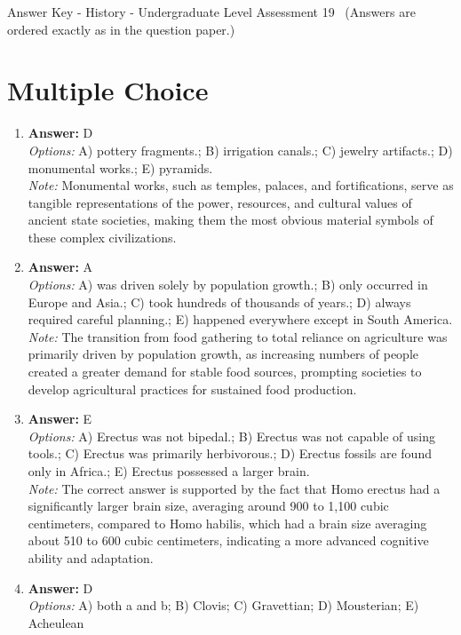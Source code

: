 \documentclass[12pt]{article}
\begin{document}
\begin{center}
Answer Key - History - Undergraduate Level Assessment 19 \
\small (Answers are ordered exactly as in the question paper.)
\end{center}

\section*{Multiple Choice}
\begin{enumerate}[label=\arabic*.]
\item \textbf{Answer:} D
\\ \textit{Options:} A) pottery fragments.; B) irrigation canals.; C) jewelry artifacts.; D) monumental works.; E) pyramids.
\\ \textit{Note:} Monumental works, such as temples, palaces, and fortifications, serve as tangible representations of the power, resources, and cultural values of ancient state societies, making them the most obvious material symbols of these complex civilizations.
\item \textbf{Answer:} A
\\ \textit{Options:} A) was driven solely by population growth.; B) only occurred in Europe and Asia.; C) took hundreds of thousands of years.; D) always required careful planning.; E) happened everywhere except in South America.
\\ \textit{Note:} The transition from food gathering to total reliance on agriculture was primarily driven by population growth, as increasing numbers of people created a greater demand for stable food sources, prompting societies to develop agricultural practices for sustained food production.
\item \textbf{Answer:} E
\\ \textit{Options:} A) Erectus was not bipedal.; B) Erectus was not capable of using tools.; C) Erectus was primarily herbivorous.; D) Erectus fossils are found only in Africa.; E) Erectus possessed a larger brain.
\\ \textit{Note:} The correct answer is supported by the fact that Homo erectus had a significantly larger brain size, averaging around 900 to 1,100 cubic centimeters, compared to Homo habilis, which had a brain size averaging about 510 to 600 cubic centimeters, indicating a more advanced cognitive ability and adaptation.
\item \textbf{Answer:} D
\\ \textit{Options:} A) both a and b; B) Clovis; C) Gravettian; D) Mousterian; E) Acheulean

\end{enumerate}
\end{document}
